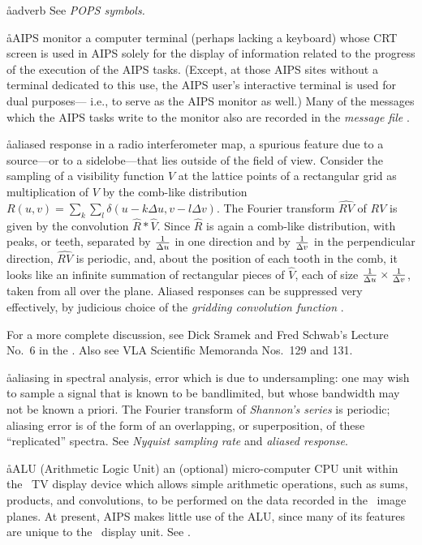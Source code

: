\aa{adverb} See {\it POPS symbols.}

\aa{AIPS monitor}
a computer terminal (perhaps lacking a keyboard) whose CRT
screen is used in AIPS solely for the display of information
related to the progress of the execution of the AIPS tasks.
(Except, at those AIPS sites without a terminal dedicated to this use,
the AIPS user's interactive terminal is used for dual purposes---%
i.e., to serve as the AIPS monitor as well.)
Many of the messages which the AIPS tasks write to the monitor
also are recorded in the {\it message file} \qv.

\aa{aliased response}
in a radio interferometer map, a spurious feature due to
a source---or to a sidelobe---that lies outside of the field of view.
Consider the sampling of a visibility function $V$
at the lattice points of a rectangular grid
as multiplication of $V$ by the comb-like distribution
$R(u,v)=\sum_k\sum_l\delta(u-k\Delta u,v-l\Delta v)$.
The Fourier transform $\widehat {RV}$ of $RV$ is given
by the convolution $\hat R\ast\hat V$.
Since $\hat R$ is again a comb-like distribution, with
peaks, or teeth, separated by ${1\over\Delta u}$ in one direction
and by ${1\over\Delta v}$ in the perpendicular direction,
$\widehat {RV}$ is periodic,
and, about the position of each tooth in the comb,
it looks like an infinite summation of rectangular pieces of $\hat V$,
each of size ${1\over\Delta u}\times{1\over\Delta v}$,
taken from all over the plane.
Aliased responses can be suppressed very effectively, by judicious
choice of the {\it gridding convolution function} \qv.
\par
For a more complete discussion, see Dick Sramek and Fred Schwab's Lecture
No.~6 in the \sira.
Also see VLA Scientific Memoranda Nos.~129 and 131.

\aa{aliasing}
in spectral analysis, error which is due to undersampling:
one may wish to sample a signal that is known to be bandlimited,
but whose bandwidth may not be known a priori.
The Fourier transform of {\it Shannon's series} is periodic;
aliasing error is of the form of an overlapping, or superposition,
of these ``replicated'' spectra.
See {\it Nyquist sampling rate} and {\it aliased response}.

\aa{ALU}
(Arithmetic Logic Unit) an (optional) micro-computer CPU unit
within the \iis\ TV display device which allows simple
arithmetic operations, such as sums, products, and convolutions,
to be performed on the data recorded in the \iis\ image planes.
At present, AIPS makes little use of the ALU, since
many of its features are unique to the \iis\ display unit.
See {\it \iis}.

